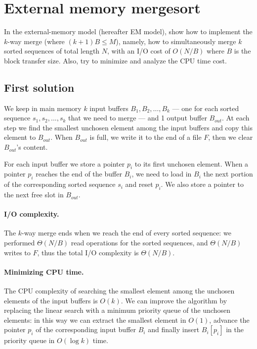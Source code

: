 \section{External memory mergesort}
In the external-memory model (hereafter EM model), show how to implement the $k$-way merge (where $(k + 1)B \leq M$), namely, how to simultaneously merge $k$ sorted sequences of total length $N$, with an I/O cost of $O(N/B)$ where $B$ is the block transfer size. Also, try to minimize and analyze the CPU time cost.

\subsection{First solution}

We keep in main memory $k$ input buffers $B_1, B_2, \dots, B_k$ --- one for each sorted sequence $s_1, s_2, ..., s_k$ that we need to merge --- and 1 output buffer $B_{out}$. At each step we find the smallest unchosen element among the input buffers and copy this element to $B_{out}$. When $B_{out}$ is full, we write it to the end of a file $F$, then we clear $B_{out}$'s content.

For each input buffer we store a pointer $p_i$ to its first unchosen element. When a pointer $p_i$ reaches the end of the buffer $B_i$, we need to load in $B_i$ the next portion of the corresponding sorted sequence $s_i$ and reset $p_i$. We also store a pointer to the next free slot in $B_{out}$.

\paragraph{I/O complexity.} The $k$-way merge ends when we reach the end of every sorted sequence: we performed $\Theta(N/B)$ read operations for the sorted sequences, and $\Theta(N/B)$ writes to $F$, thus the total I/O complexity is $\Theta(N/B)$.

\paragraph{Minimizing CPU time.} The CPU complexity of searching the smallest element among the unchosen elements of the input buffers is $O(k)$. We can improve the algorithm by replacing the linear search with a minimum priority queue of the unchosen elements: in this way we can extract the smallest element in $O(1)$, advance the pointer $p_i$ of the corresponding input buffer $B_i$ and finally insert $B_i[p_i]$ in the priority queue in $O(\log k)$ time.


